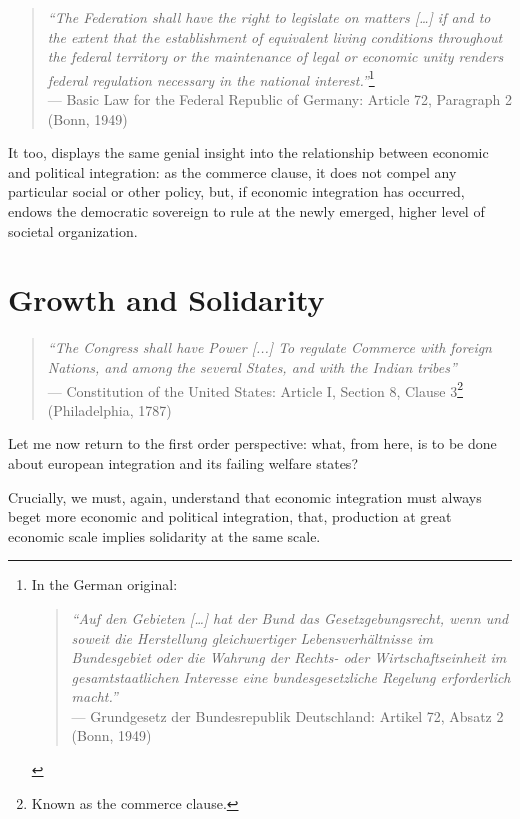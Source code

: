 \begin{quote}
	\emph{``The Federation shall have the right to legislate on matters [\ldots] if and to the extent that the establishment of equivalent living conditions throughout the federal territory or the maintenance of legal or economic unity renders federal regulation necessary in the national interest.''}\footnote{
		In the German original:
			\begin{quote}
				\emph{``Auf den Gebieten [\ldots] hat der Bund das Gesetzgebungsrecht, wenn und soweit die Herstellung gleichwertiger Lebensverhältnisse im Bundesgebiet oder die Wahrung der Rechts- oder Wirtschaftseinheit im gesamtstaatlichen Interesse eine bundesgesetzliche Regelung erforderlich macht.''}\\
				--- Grundgesetz der Bundesrepublik Deutschland: Artikel 72, Absatz 2 (Bonn, 1949)
			\end{quote}}\\
	--- Basic Law for the Federal Republic of Germany: Article 72, Paragraph 2 (Bonn, 1949)
\end{quote}

It too, displays the same genial insight into the relationship between economic and political integration: as the commerce clause, it does not compel any particular social or other policy, but, if economic integration has occurred, endows the democratic sovereign to rule at the newly emerged, higher level of societal organization.


\section{Growth and Solidarity} \label{sec:growth-solidarity}

\begin{quote}
	\emph{``The Congress shall have Power [...] To regulate Commerce with foreign Nations, and among the several States, and with the Indian tribes''}\\
	--- Constitution of the United States: Article I, Section 8, Clause 3\footnote{
		Known as the commerce clause.} 
	(Philadelphia, 1787)
\end{quote}

Let me now return to the first order perspective: what, from here, is to be done about european integration and its failing welfare states?

Crucially, we must, again, understand that economic integration must always beget more economic and political integration, that, production at great economic scale implies solidarity at the same scale.

